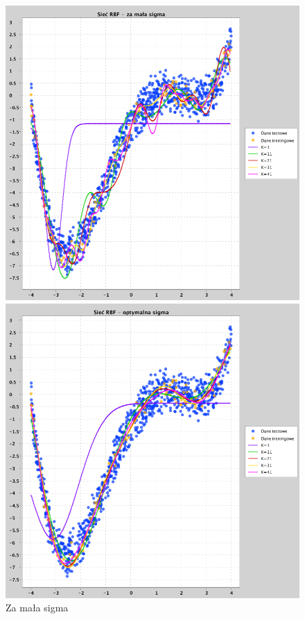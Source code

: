 \documentclass[a4paper, portrait,11pt]{article}
\begin{document}
\begin{figure}[!htb]
  \begin{minipage}{0.33\textwidth}
    \centering
    \includegraphics[width=1\linewidth]{../data/approximation3/1/small.png}
    \caption{Za mała sigma}
  \end{minipage}
  \begin{minipage}{0.33\textwidth}
    \centering
    \includegraphics[width=1\linewidth]{../data/approximation3/1/optimal.png}

\end{minipage}
\end{figure}
\end{document}
